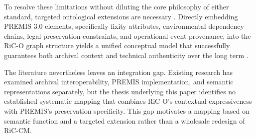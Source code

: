 \documentclass[runningheads]{llncs}
\begin{document}
	To resolve these limitations without diluting the core philosophy of either standard, targeted ontological extensions are necessary \cite{corrado2017digital}. Directly embedding PREMIS 3.0 elements, specifically fixity attributes, environmental dependency chains, legal preservation constraints, and operational event provenance, into the RiC-O graph structure yields a unified conceptual model that successfully guarantees both archival context and technical authenticity over the long term \cite{coppens2015premis,di2016premis}.
	
	The literature nevertheless leaves an integration gap. Existing research has examined archival interoperability, PREMIS implementation, and semantic representations separately, but the thesis underlying this paper identifies no established systematic mapping that combines RiC-O's contextual expressiveness with PREMIS's preservation specificity. This gap motivates a mapping based on semantic function and a targeted extension rather than a wholesale redesign of RiC-CM.
	
\end{document}
